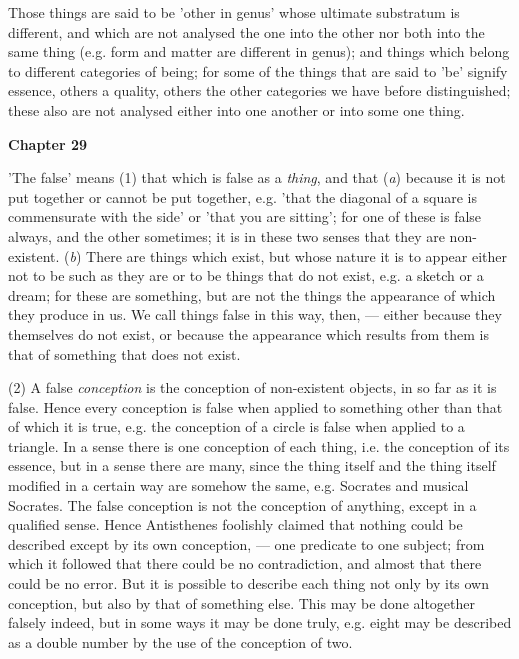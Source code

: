 Those things are said to be 'other in genus' whose ultimate substratum is different, and which are not analysed the one into the other nor both into the same thing (e.g. form and matter are different in genus); and things which belong to different categories of being; for some of the things that are said to 'be' signify essence, others a quality, others the other categories we have before distinguished; these also are not analysed either into one another or into some one thing.

\textbf{Chapter 29}

'The false' means (1) that which is false as a \emph{thing}, and that (\emph{a}) because it is not put together or cannot be put together, e.g. 'that the diagonal of a square is commensurate with the side' or 'that you are sitting'; for one of these is false always, and the other sometimes; it is in these two senses that they are non-existent. (\emph{b}) There are things which exist, but whose nature it is to appear either not to be such as they are or to be things that do not exist, e.g. a sketch or a dream; for these are something, but are not the things the appearance of which they produce in us. We call things false in this way, then, — either because they themselves do not exist, or because the appearance which results from them is that of something that does not exist.

(2) A false \emph{conception} is the conception of non-existent objects, in so far as it is false. Hence every conception is false when applied to something other than that of which it is true, e.g. the conception of a circle is false when applied to a triangle. In a sense there is one conception of each thing, i.e. the conception of its essence, but in a sense there are many, since the thing itself and the thing itself modified in a certain way are somehow the same, e.g. Socrates and musical Socrates. The false conception is not the conception of anything, except in a qualified sense. Hence Antisthenes foolishly claimed that nothing could be described except by its own conception, — one predicate to one subject; from which it followed that there could be no contradiction, and almost that there could be no error. But it is possible to describe each thing not only by its own conception, but also by that of something else. This may be done altogether falsely indeed, but in some ways it may be done truly, e.g. eight may be described as a double number by the use of the conception of two.

